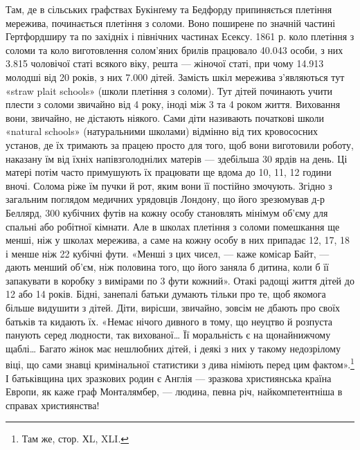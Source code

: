 Там, де в сільських графствах Букінґему та Бедфорду припиняється
плетіння мережива, починається плетіння з соломи. Воно
поширене по значній частині Гертфордширу та по західніх і північних
частинах Есексу. 1861 р. коло плетіння з соломи та коло
виготовлення солом’яних брилів працювало \num{40.043} особи, з них
\num{3.815} чоловічої статі всякого віку, решта — жіночої статі, при
чому \num{14.913} молодші від 20 років, з них \num{7.000} дітей. Замість шкіл
мережива з’являються тут «straw plait schools» (школи плетіння
з соломи). Тут дітей починають учити плести з соломи звичайно
від 4 року, іноді між 3 та 4 роком життя. Виховання вони, звичайно,
не дістають ніякого. Сами діти називають початкові школи
«natural schools» (натуральними школами) відмінно від тих кровососних
установ, де їх тримають за працею просто для того, щоб
вони виготовили роботу, наказану їм від їхніх напівзголоднілих
матерів — здебільша 30 ярдів на день. Ці матері потім часто
примушують їх працювати ще вдома до 10, 11, 12 години вночі.
Солома ріже їм пучки й рот, яким вони її постійно змочують.
Згідно з загальним поглядом медичних урядовців Лондону, що
його зрезюмував д-р Беллярд, 300 кубічних футів на кожну
особу становлять мінімум об’єму для спальні або робітної
кімнати. Але в школах плетіння з соломи помешкання ще менші,
ніж у школах мережива, а саме на кожну особу в них припадає
12, 17, 18 і менше ніж 22 кубічні фути. «Менші з цих чисел, —
каже комісар Байт, — дають менший об’єм, ніж половина того,
що його заняла б дитина, коли б її запакувати в коробку з вимірами
по 3 фути кожний». Отакі радощі життя дітей до 12 або
14 років. Бідні, занепалі батьки думають тільки про те, щоб
якомога більше видушити з дітей. Діти, вирісши, звичайно,
зовсім не дбають про своїх батьків та кидають їх. «Немає нічого
дивного в тому, що неуцтво й розпуста панують серед людности,
так вихованої\dots{} Її моральність є на щонайнижчому щаблі\dots{} Багато
жінок має нешлюбних дітей, і деякі з них у такому недозрілому
віці, що сами знавці кримінальної статистики з дива німіють
перед цим фактом».\footnote{
Там же, стор. ХL, XLI.
} І батьківщина цих зразкових родин є
Англія — зразкова християнська країна Европи, як каже граф
Монталямбер, — людина, певна річ, найкомпетентніша в справах
християнства!
